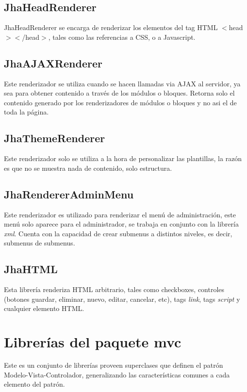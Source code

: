 \subsection{JhaHeadRenderer}
JhaHeadRenderer se encarga de renderizar los elementos del tag HTML $<$head$><$/head$>$, tales como las referencias a CSS, o a Javascript.

\subsection{JhaAJAXRenderer}
Este renderizador se utiliza cuando se hacen llamadas via AJAX al servidor, ya sea para obtener contenido a trav\'es de los m\'odulos o bloques. Retorna solo el contenido generado por los renderizadores de m\'odulos o bloques y no asi el de toda la p\'agina.

\subsection{JhaThemeRenderer}
Este renderizador solo se utiliza a la hora de personalizar las plantillas, la raz\'on es que no se muestra nada de contenido, solo estructura.

\subsection{JhaRendererAdminMenu}
Este renderizador es utilizado para renderizar el men\'u de administraci\'on, este men\'u solo aparece para el administrador, se trabaja en conjunto con la librer\'ia \textit{xml}. Cuenta con la capacidad de crear submenus a distintos niveles, es decir, submenus de submenus.

\subsection{JhaHTML}
Esta librer\'ia renderiza HTML arbitrario, tales como checkboxes, controles (botones guardar, eliminar, nuevo, editar, cancelar, etc), tags \textit{link}, tags \textit{script} y cualquier elemento HTML.

\section{Librer\'ias del paquete \textsf{mvc}}
Este es un conjunto de librer\'ias proveen superclases que definen el patr\'on Modelo-Vista-Controlador, generalizando las caracter\'isticas comunes a cada elemento del patr\'on.

